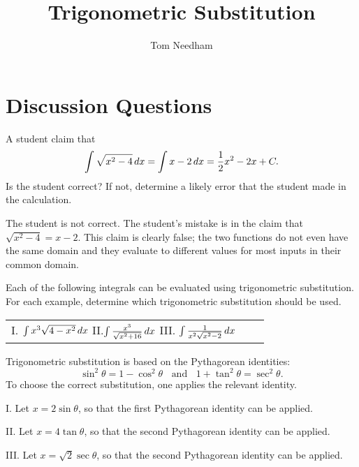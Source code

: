 \documentclass[]{ximera}
\author{Tom Needham}
\title[]{Trigonometric Substitution}
\begin{document}
\begin{abstract}
\end{abstract}
\maketitle

\vspace{-0.45in}

\section{Discussion Questions}

\begin{problem}
A student claim that
$$
\int \sqrt{x^2-4} \mathop{}\!d x = \int x-2 \mathop{}\!d x = \frac{1}{2}x^2 - 2x + C.
$$
Is the student correct? If not, determine a likely error that the student made in the calculation.
\end{problem}

\begin{freeResponse}
The student is not correct. The student's mistake is in the claim that $\sqrt{x^2-4}=x-2$. This claim is clearly false; the two functions do not even have the same domain and they evaluate to different values for most inputs in their common domain.
\end{freeResponse}

\begin{problem}
Each of the following integrals can be evaluated using trigonometric substitution. For each example, determine which trigonometric substitution should be used.

\begin{center}
\begin{tabular}{lll}
I. $\int x^3 \sqrt{4-x^2} \mathop{}\!d x $ \hspace{.2in} II.$\int \frac{x^3}{\sqrt{x^2+16}} \mathop{}\!d x$ \hspace{.2in} III. $\int \frac{1}{x^2 \sqrt{x^2-2}} \mathop{}\!d x$
\end{tabular}
\end{center}
\end{problem}

\begin{freeResponse}
Trigonometric substitution is based on the Pythagorean identities:
$$
\sin^2 \theta  = 1 - \cos^2 \theta \;\; \mbox{ and } \;\;  1 + \tan^2 \theta = \sec^2 \theta.
$$
To choose the correct substitution, one applies the relevant identity.

I. Let $x = 2 \sin \theta$, so that the first Pythagorean identity can be applied.

II. Let $x=4 \tan \theta$, so that the second Pythagorean identity can be applied.

III. Let $x=\sqrt{2}\sec \theta$, so that the second Pythagorean identity can be applied.
\end{freeResponse}
\end{document}
